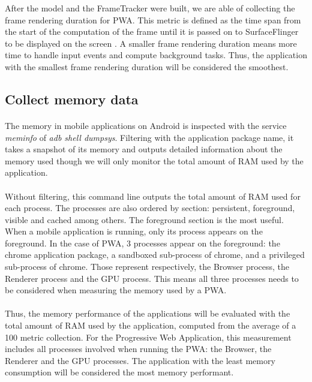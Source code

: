 \documentclass{kththesis}
\begin{document}
After the model and the FrameTracker were built, we are able of collecting the frame rendering duration for PWA. This metric is defined as the time span from the start of the computation of the frame until it is passed on to SurfaceFlinger to be displayed on the screen . A smaller frame rendering duration means more time to handle input events and compute background tasks. Thus, the application with the smallest frame rendering duration will be considered the smoothest.
\fi

\subsection{Collect memory data}

\paragraph{}
The memory in mobile applications on Android is inspected with the service \textit{meminfo} of \textit{adb shell dumpsys}. Filtering with the application package name, it takes a snapshot of its memory and outputs detailed information about the memory used though we will only monitor the total amount of RAM used by the application.

\paragraph{}
Without filtering, this command line outputs the total amount of RAM used for each process. The processes are also ordered by section: persistent, foreground, visible and cached among others. \newline
The foreground section is the most useful. When a mobile application is running, only its process appears on the foreground. In the case of PWA, 3 processes appear on the foreground: the chrome application package, a sandboxed sub-process of chrome, and a privileged sub-process of chrome. Those represent respectively, the Browser process, the Renderer process and the GPU process. This means all three processes needs to be considered when measuring the memory used by a PWA. 

\paragraph{}
Thus, the memory performance of the applications will be evaluated with the total amount of RAM used by the application, computed from the average of a 100 metric collection. For the Progressive Web Application, this measurement includes all processes involved when running the PWA: the Browser, the Renderer and the GPU processes. The application with the least memory consumption will be considered the most memory performant.
\end{document}

